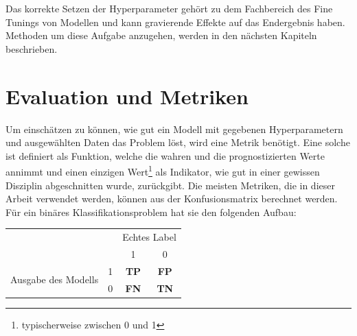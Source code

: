 Das korrekte Setzen der Hyperparameter gehört zu dem Fachbereich des Fine Tunings von Modellen und kann
 gravierende Effekte auf das Endergebnis haben. Methoden um diese Aufgabe anzugehen, werden in den
 nächsten Kapiteln beschrieben.


\section{Evaluation und Metriken}

Um einschätzen zu können, wie gut ein Modell mit gegebenen Hyperparametern und ausgewählten Daten das Problem
 löst, wird eine Metrik benötigt. Eine solche ist definiert als Funktion, welche die wahren und die
 prognostizierten Werte annimmt und einen einzigen Wert\footnote{typischerweise zwischen 0 und 1} als
 Indikator, wie gut in einer gewissen Disziplin abgeschnitten wurde, zurückgibt. Die meisten Metriken,
 die in dieser Arbeit verwendet werden, können aus der Konfusionsmatrix berechnet werden. Für ein binäres
 Klassifikationsproblem hat sie den folgenden Aufbau:

\renewcommand{\arraystretch}{1.5}
\begin{table}[h]
    \centering
    \begin{tabular}{c c c c}
        & & \multicolumn{2}{c}{Echtes Label} \\
        \cline{3-4}
        & & 1 & 0 \\
        \hline
        \multirow{2}{10em}{Ausgabe des Modells} & 1 & \textbf{TP} & \textbf{FP} \\
        \cline{2-4}
        & 0 & \textbf{FN} & \textbf{TN} \\
        \hline
    \end{tabular}
\end{table}



